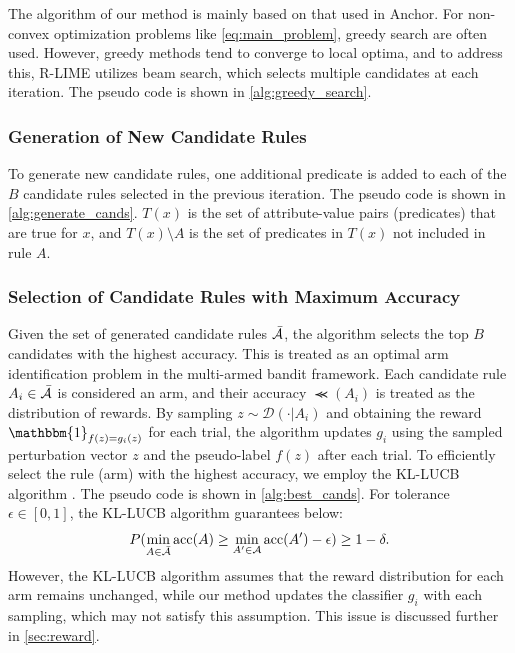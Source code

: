 \documentclass[11pt]{article}
\begin{document}
The algorithm of our method
is mainly based on that used in Anchor\cite{ribeiro2018anchors}.
For non-convex optimization problems like \cref{eq:main_problem},
greedy search are often used.
However,
greedy methods tend to converge to local optima, and to address this,
R-LIME utilizes beam search,
which selects multiple candidates at each iteration.
The pseudo code is shown in \cref{alg:greedy_search}.

\subsubsection{Generation of New Candidate Rules}
To generate new candidate rules,
one additional predicate is added to each of the $B$ candidate rules
selected in the previous iteration.
The pseudo code is shown in \cref{alg:generate_cands}.
$T(x)$ is the set of attribute-value pairs (predicates) that are true for $x$,
and $T(x)\setminus A$ is the set of predicates in $T(x)$ not included in rule $A$.

\subsubsection{Selection of Candidate Rules with Maximum Accuracy}
Given the set of generated candidate rules $\bar{\mathcal{A}}$,
the algorithm selects the top $B$ candidates with the highest accuracy.
This is treated as an optimal arm identification problem in the multi-armed bandit framework.
Each candidate rule $A_i\in\bar{\mathcal{A}}$ is considered an arm,
and their accuracy $\Prec(A_i)$ is treated as the distribution of rewards.
By sampling $z\sim\mathcal{D}(\cdot|A_i)$
and obtaining the reward $\mathbbm{1}_{f(z)=g_i(z)}$ for each trial,
the algorithm updates $g_i$ using the sampled perturbation vector $z$
and the pseudo-label $f(z)$ after each trial.
To efficiently select the rule (arm) with the highest accuracy,
we employ the KL-LUCB algorithm \cite{kaufmann2013information}.
The pseudo code is shown in \cref{alg:best_cands}.
For tolerance $\epsilon\in[0,1]$, the KL-LUCB algorithm guarantees below:
\begin{equation}
	P(\underset{A\in\bar{\mathcal{A}}}{\min}\operatorname{acc}(A)\ge
	\underset{A'\in\mathcal{A}}{\min}\operatorname{acc}(A')-\epsilon)\ge1-\delta.
\end{equation}
However,
the KL-LUCB algorithm assumes that the reward distribution for each arm
remains unchanged,
while our method updates the classifier $g_i$ with each sampling,
which may not satisfy this assumption.
This issue is discussed further in \cref{sec:reward}.
\end{document}
